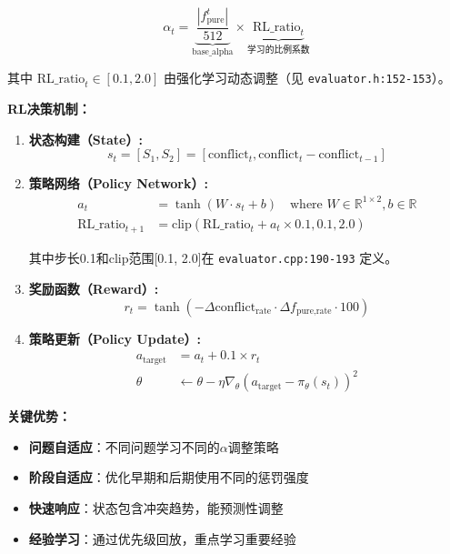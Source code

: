 \documentclass[15pt,a3paper]{ctexart}
\begin{document}
\begin{equation}
\alpha_t = \underbrace{\frac{|f^t_{\text{pure}}|}{512}}_{\text{base\_alpha}} \times \underbrace{\text{RL\_ratio}_t}_{\text{学习的比例系数}}
\end{equation}

其中 $\text{RL\_ratio}_t \in [0.1, 2.0]$ 由强化学习动态调整（见 \texttt{evaluator.h:152-153}）。

\textbf{RL决策机制：}

\begin{enumerate}
    \item \textbf{状态构建（State）:}
    \begin{equation}
    s_t = [S_1, S_2] = [\text{conflict}_t, \text{conflict}_t - \text{conflict}_{t-1}]
    \end{equation}
    
    \item \textbf{策略网络（Policy Network）:}
    \begin{align}
    a_t &= \tanh(W \cdot s_t + b) \quad \text{where } W \in \mathbb{R}^{1 \times 2}, b \in \mathbb{R} \\
    \text{RL\_ratio}_{t+1} &= \text{clip}(\text{RL\_ratio}_t + a_t \times 0.1, 0.1, 2.0)
    \end{align}
    
    其中步长0.1和clip范围[0.1, 2.0]在 \texttt{evaluator.cpp:190-193} 定义。
    
    \item \textbf{奖励函数（Reward）:}
    \begin{equation}
    r_t = \tanh\!\left(-\Delta\text{conflict}_{\text{rate}} \cdot \Delta f_{\text{pure,rate}} \cdot 100\right)
    \end{equation}
    
    \item \textbf{策略更新（Policy Update）:}
    \begin{align}
    a_{\text{target}} &= a_t + 0.1 \times r_t \\
    \theta &\leftarrow \theta - \eta \nabla_\theta (a_{\text{target}} - \pi_\theta(s_t))^2
    \end{align}
\end{enumerate}

\textbf{关键优势：}
\begin{itemize}
    \item \textbf{问题自适应}：不同问题学习不同的$\alpha$调整策略
    \item \textbf{阶段自适应}：优化早期和后期使用不同的惩罚强度
    \item \textbf{快速响应}：状态包含冲突趋势，能预测性调整
    \item \textbf{经验学习}：通过优先级回放，重点学习重要经验
\end{itemize}
\end{document}
